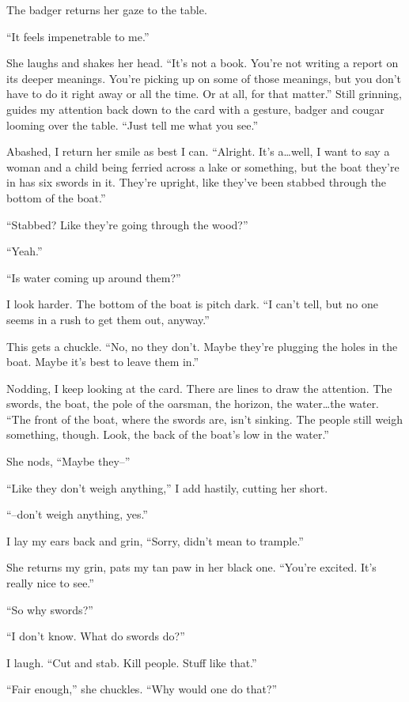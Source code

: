 The badger returns her gaze to the table.

``It feels impenetrable to me.''

She laughs and shakes her head. ``It's not a book. You're not writing a
report on its deeper meanings. You're picking up on some of those
meanings, but you don't have to do it right away or all the time. Or at
all, for that matter.'' Still grinning, guides my attention back down to
the card with a gesture, badger and cougar looming over the table.
``Just tell me what you see.''

Abashed, I return her smile as best I can. ``Alright. It's
a\ldots{}well, I want to say a woman and a child being ferried across a
lake or something, but the boat they're in has six swords in it. They're
upright, like they've been stabbed through the bottom of the boat.''

``Stabbed? Like they're going through the wood?''

``Yeah.''

``Is water coming up around them?''

I look harder. The bottom of the boat is pitch dark. ``I can't tell, but
no one seems in a rush to get them out, anyway.''

This gets a chuckle. ``No, no they don't. Maybe they're plugging the
holes in the boat. Maybe it's best to leave them in.''

Nodding, I keep looking at the card. There are lines to draw the
attention. The swords, the boat, the pole of the oarsman, the horizon,
the water\ldots{}the water. ``The front of the boat, where the swords
are, isn't sinking. The people still weigh something, though. Look, the
back of the boat's low in the water.''

She nods, ``Maybe they--''

``Like they don't weigh anything,'' I add hastily, cutting her short.

``--don't weigh anything, yes.''

I lay my ears back and grin, ``Sorry, didn't mean to trample.''

She returns my grin, pats my tan paw in her black one. ``You're excited.
It's really nice to see.''

``So why swords?''

``I don't know. What do swords do?''

I laugh. ``Cut and stab. Kill people. Stuff like that.''

``Fair enough,'' she chuckles. ``Why would one do that?''

